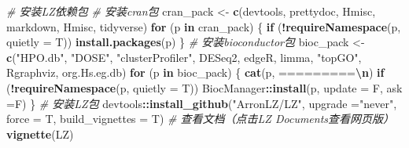 \documentclass[
]{book}
\newenvironment{Shaded}{\begin{snugshade}}{\end{snugshade}}
\newcommand{\AttributeTok}[1]{\textcolor[rgb]{0.13,0.29,0.53}{#1}}
\newcommand{\CommentTok}[1]{\textcolor[rgb]{0.56,0.35,0.01}{\textit{#1}}}
\newcommand{\ControlFlowTok}[1]{\textcolor[rgb]{0.13,0.29,0.53}{\textbf{#1}}}
\newcommand{\FunctionTok}[1]{\textcolor[rgb]{0.13,0.29,0.53}{\textbf{#1}}}
\newcommand{\NormalTok}[1]{#1}
\newcommand{\OtherTok}[1]{\textcolor[rgb]{0.56,0.35,0.01}{#1}}
\newcommand{\SpecialCharTok}[1]{\textcolor[rgb]{0.81,0.36,0.00}{\textbf{#1}}}
\newcommand{\StringTok}[1]{\textcolor[rgb]{0.31,0.60,0.02}{#1}}
\begin{document}
\begin{Shaded}
\begin{Highlighting}[]
\CommentTok{\# 安装LZ依赖包}
\CommentTok{\# 安装cran包}
\NormalTok{cran\_pack }\OtherTok{\textless{}{-}} \FunctionTok{c}\NormalTok{(}\StringTok{\textquotesingle{}devtools\textquotesingle{}}\NormalTok{, }\StringTok{\textquotesingle{}prettydoc\textquotesingle{}}\NormalTok{, }\StringTok{\textquotesingle{}Hmisc\textquotesingle{}}\NormalTok{, }\StringTok{\textquotesingle{}markdown\textquotesingle{}}\NormalTok{, }
               \StringTok{\textquotesingle{}Hmisc\textquotesingle{}}\NormalTok{, }\StringTok{\textquotesingle{}tidyverse\textquotesingle{}}\NormalTok{)}
\ControlFlowTok{for}\NormalTok{ (p }\ControlFlowTok{in}\NormalTok{ cran\_pack) \{ }\ControlFlowTok{if}\NormalTok{ (}\SpecialCharTok{!}\FunctionTok{requireNamespace}\NormalTok{(p, }\AttributeTok{quietly =}\NormalTok{ T)) }\FunctionTok{install.packages}\NormalTok{(p) \}}
\CommentTok{\# 安装bioconductor包}
\NormalTok{bioc\_pack }\OtherTok{\textless{}{-}} \FunctionTok{c}\NormalTok{(}\StringTok{"HPO.db"}\NormalTok{, }\StringTok{"DOSE"}\NormalTok{, }\StringTok{"clusterProfiler"}\NormalTok{, }\StringTok{\textquotesingle{}DESeq2\textquotesingle{}}\NormalTok{, }\StringTok{\textquotesingle{}edgeR\textquotesingle{}}\NormalTok{, }
               \StringTok{\textquotesingle{}limma\textquotesingle{}}\NormalTok{, }\StringTok{"topGO"}\NormalTok{, }\StringTok{\textquotesingle{}Rgraphviz\textquotesingle{}}\NormalTok{, }\StringTok{\textquotesingle{}org.Hs.eg.db\textquotesingle{}}\NormalTok{)}
\ControlFlowTok{for}\NormalTok{ (p }\ControlFlowTok{in}\NormalTok{ bioc\_pack) \{ }
  \FunctionTok{cat}\NormalTok{(p, }\StringTok{\textquotesingle{}=========}\SpecialCharTok{\textbackslash{}n}\StringTok{\textquotesingle{}}\NormalTok{) }
  \ControlFlowTok{if}\NormalTok{ (}\SpecialCharTok{!}\FunctionTok{requireNamespace}\NormalTok{(p, }\AttributeTok{quietly =}\NormalTok{ T)) BiocManager}\SpecialCharTok{::}\FunctionTok{install}\NormalTok{(p, }\AttributeTok{update =}\NormalTok{ F, }\AttributeTok{ask =}\NormalTok{F) }
\NormalTok{\}}
\CommentTok{\# 安装LZ包}
\NormalTok{devtools}\SpecialCharTok{::}\FunctionTok{install\_github}\NormalTok{(}\StringTok{"ArronLZ/LZ"}\NormalTok{, }\AttributeTok{upgrade =}\StringTok{"never"}\NormalTok{, }\AttributeTok{force =}\NormalTok{ T, }
                         \AttributeTok{build\_vignettes =}\NormalTok{ T)}
\CommentTok{\# 查看文档（点击LZ Documents查看网页版）}
\FunctionTok{vignette}\NormalTok{(}\StringTok{\textquotesingle{}LZ\textquotesingle{}}\NormalTok{)}
\end{Highlighting}
\end{Shaded}
\end{document}
